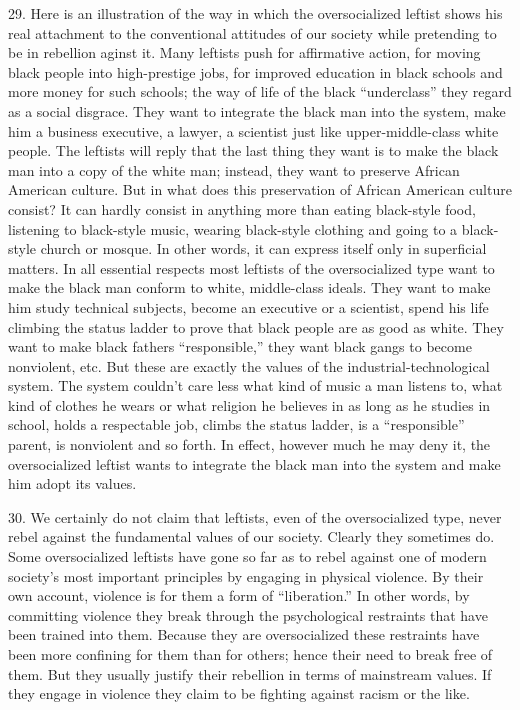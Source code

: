 \documentclass{article}
\begin{document}
29. Here is an illustration of the way in which the oversocialized leftist shows his real attachment 
to the conventional attitudes of our society while pretending to be in rebellion aginst it. Many 
leftists push for affirmative action, for moving black people into high-prestige jobs, for improved 
education in black schools and more money for such schools; the way of life of the black 
“underclass” they regard as a social disgrace. They want to integrate the black man into the 
system, make him a business executive, a lawyer, a scientist just like upper-middle-class white 
people. The leftists will reply that the last thing they want is to make the black man into a copy of 
the white man; instead, they want to preserve African American culture. But in what does this 
preservation of African American culture consist? It can hardly consist in anything more than 
eating black-style food, listening to black-style music, wearing black-style clothing and going to a 
black-style church or mosque. In other words, it can express itself only in superficial matters. In 
all essential respects most leftists of the oversocialized type want to make the black man conform 
to white, middle-class ideals. They want to make him study technical subjects, become an 
executive or a scientist, spend his life climbing the status ladder to prove that black people are as 
good as white. They want to make black fathers “responsible,” they want black gangs to become 
nonviolent, etc. But these are exactly the values of the industrial-technological system. The 
system couldn’t care less what kind of music a man listens to, what kind of clothes he wears or 
what religion he believes in as long as he studies in school, holds a respectable job, climbs the 
status ladder, is a “responsible” parent, is nonviolent and so forth. In effect, however much he 
may deny it, the oversocialized leftist wants to integrate the black man into the system and make 
him adopt its values. \vspace{\baselineskip}

30. We certainly do not claim that leftists, even of the oversocialized type, never rebel against the 
fundamental values of our society. Clearly they sometimes do. Some oversocialized leftists have 
gone so far as to rebel against one of modern society’s most important principles by engaging in 
physical violence. By their own account, violence is for them a form of “liberation.” In other 
words, by committing violence they break through the psychological restraints that have been 
trained into them. Because they are oversocialized these restraints have been more confining for 
them than for others; hence their need to break free of them. But they usually justify their rebellion 
in terms of mainstream values. If they engage in violence they claim to be fighting against racism 
or the like. \vspace{\baselineskip}
\end{document}
